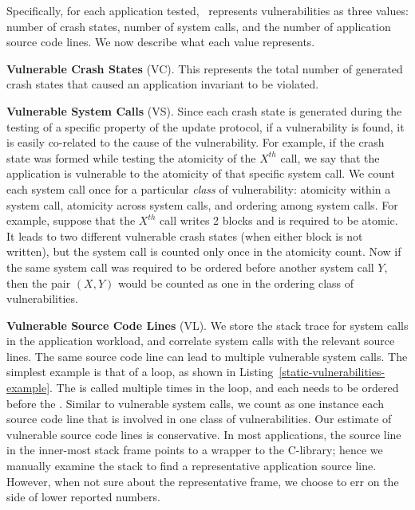 Specifically, for each application tested, \toolname\ represents
vulnerabilities as three values: number of crash states, number of system
calls, and the number of application source code lines. We now describe what
each value represents.

\textbf{Vulnerable Crash States} (VC). This represents the total number
of generated crash states that caused an application invariant to be violated.

\textbf{Vulnerable System Calls} (VS). Since each crash state is generated
during the testing of a specific property of the update protocol, if a
vulnerability is found, it is easily co-related to the cause of the
vulnerability. For example, if the crash state was formed while testing the
atomicity of the $X^{th}$  call, we say that the application
is vulnerable to the atomicity of that specific system call. We count each
system call once for a particular \textit{class} of vulnerability: atomicity
within a system call, atomicity across system calls, and ordering among system
calls. For example, suppose that the $X^{th}$  call writes 2
blocks and is required to be atomic.  It leads to two different vulnerable
crash states (when either block is not written), but the system call is
counted only once in the atomicity count. Now if the same system call was
required to be ordered before another system call $Y$, then the pair $(X, Y)$
would be counted as one in the ordering class of vulnerabilities.



\textbf{Vulnerable Source Code Lines} (VL). We store the stack trace for
system calls in the application workload, and correlate system calls with the
relevant source lines.  The same source code line can lead to  multiple
vulnerable system calls. The simplest example is that of a loop, as shown in
Listing~\ref{static-vulnerabilities-example}. The  is called
multiple times in the loop, and each  needs to be ordered
before the . Similar to vulnerable system calls, we count as
one instance each source code line that is involved in one class of
vulnerabilities. Our estimate of vulnerable source code lines is conservative.
In most applications, the source line in the inner-most stack frame points to
a wrapper to the C-library; hence we manually examine the stack to find a
representative application source line. However, when not sure about the
representative frame, we choose to err on the side of lower reported numbers.


